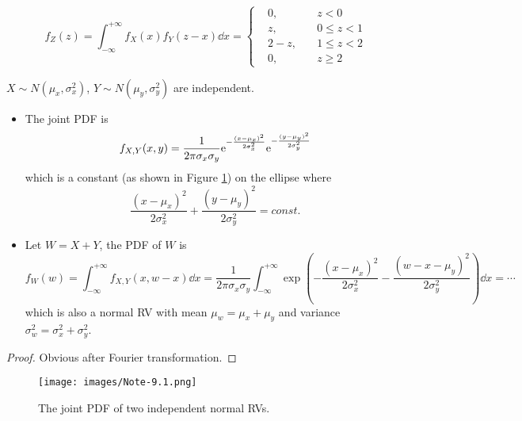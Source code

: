 \documentclass[device=normal, lang=en]{elegantbook}
\numberwithin{equation}{section}
\begin{document}
\begin{solution}
    \begin{equation}
        f_{Z}(z) = \int_{-\infty}^{+\infty} f_{X}(x) f_{Y}(z - x) \dd{x} = \left\{\begin{aligned}
            &0, \quad &z < 0 \\ 
            &z, \quad &0 \leq z < 1 \\ 
            &2 - z, \quad &1 \leq z < 2 \\
            &0, \quad &z \geq 2
        \end{aligned}\right.
    \end{equation}
\end{solution}

\begin{example}
    $X \sim N(\mu_x, \sigma_x^2)$, $Y \sim N(\mu_y, \sigma_y^2)$ are independent. 
    \begin{itemize}
        \item The joint PDF is
        \begin{equation}
            f_{X, Y}(x, y) = \frac{1}{2 \pi \sigma_x \sigma_y} \mathrm{e}^{-\frac{(x - \mu_x)^2}{2 \sigma_x^2}} \mathrm{e}^{-\frac{(y - \mu_y)^2}{2 \sigma_y^2}}
        \end{equation}
        which is a constant (as shown in Figure \ref{fig:equal-probability-ellipse}) on the ellipse where
        \begin{equation}
            \frac{(x - \mu_x)^2}{2\sigma_x^2} + \frac{(y - \mu_y)^2}{2\sigma_y^2} = const.
        \end{equation}
        \item Let $W = X + Y$, the PDF of $W$ is
        \begin{equation}
            f_{W}(w) = \int_{-\infty}^{+\infty} f_{X, Y}(x, w - x) \dd{x} = \frac{1}{2\pi\sigma_x\sigma_y}\int_{-\infty}^{+\infty} \exp\left(-\frac{(x - \mu_x)^2}{2\sigma_x^2} -\frac{(w - x - \mu_y)^2}{2\sigma_y^2}\right) \dd{x}
            = \cdots
        \end{equation}
        which is also a normal RV with mean $\mu_w = \mu_x + \mu_y$ and variance $\sigma_w^2 = \sigma_x^2 + \sigma_y^2$.
    \end{itemize}
    \begin{proof}
        Obvious after Fourier transformation.
    \end{proof}
    \begin{figure}[H]
        \centering
        \texttt{[image: images/Note-9.1.png]}
        \caption{The joint PDF of two independent normal RVs.}
        \label{fig:equal-probability-ellipse}
    \end{figure}
\end{example}
\end{document}
